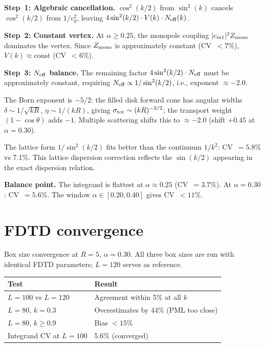 \documentclass[11pt]{article}
\begin{document}
\textbf{Step~1: Algebraic cancellation.}
$\cos^2(k/2)$ from $\sin^2(k)$ cancels $\cos^2(k/2)$ from $1/v_g^2$,
leaving $4\sin^2(k/2) \cdot V(k) \cdot N_{\rm eff}(k)$.

\textbf{Step~2: Constant vertex.}
At $\alpha \geq 0.25$, the monopole coupling $|c_{m1}|^2 Z_{\rm mono}$
dominates the vertex. Since $Z_{\rm mono}$ is approximately constant
(CV~$< 7\%$), $V(k) \approx \mathrm{const}$ (CV~$< 6\%$).

\textbf{Step~3: $N_{\rm eff}$ balance.}
The remaining factor $4\sin^2(k/2) \cdot N_{\rm eff}$ must be approximately
constant, requiring $N_{\rm eff} \propto 1/\sin^2(k/2)$, i.e., exponent
$\approx -2.0$.

The Born exponent is $-5/2$: the filled disk forward cone has angular widths
$\delta \sim 1/\sqrt{kR}$, $\eta \sim 1/(kR)$, giving
$\sigma_{\rm tot} \sim (kR)^{-3/2}$; the transport weight
$(1 - \cos\theta)$ adds $-1$. Multiple scattering shifts this to
$\approx -2.0$ (shift $+0.45$ at $\alpha = 0.30$).

The lattice form $1/\sin^2(k/2)$ fits better than the continuum $1/k^2$:
CV~$= 5.8\%$ vs 7.1\%. This lattice dispersion correction reflects the
$\sin(k/2)$ appearing in the exact dispersion relation.

\textbf{Balance point.}
The integrand is flattest at $\alpha \approx 0.25$ (CV~$= 3.7\%$). At
$\alpha = 0.30$: CV~$= 5.6\%$. The window $\alpha \in [0.20, 0.40]$ gives
CV~$< 11\%$.

\section{FDTD convergence}
\label{sec:convergence}

Box size convergence at $R = 5$, $\alpha = 0.30$. All three box sizes are
run with identical FDTD parameters; $L = 120$ serves as reference.

\begin{table}[h]
\begin{tabular}{ll}
\hline
Test & Result \\
\hline
$L = 100$ vs $L = 120$ & Agreement within 5\% at all $k$ \\
$L = 80$, $k = 0.3$ & Overestimates by 44\% (PML too close) \\
$L = 80$, $k \geq 0.9$ & Bias $< 15\%$ \\
Integrand CV at $L = 100$ & 5.6\% (converged) \\
\hline
\end{tabular}
\end{table}
\end{document}
